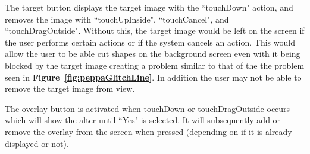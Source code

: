 \documentclass[11pt]{article}
\begin{document}
                    The target button displays the target image with the ``touchDown" action, and removes the image with ``touchUpInside", ``touchCancel", and ``touchDragOutside". Without this, the target image would be left on the screen if the user performs certain actions or if the system cancels an action. This would allow the user to be able cut shapes on the background screen even with it being blocked by the target image creating a problem similar to that of the the problem seen in \textbf{Figure~\ref{fig:peppaGlitchLine}}. In addition the user may not be able to remove the target image from view. 
                    
                    The overlay button is activated when touchDown or touchDragOutside occurs which will show the alter until ``Yes" is selected. It will subsequently add or remove the overlay from the screen when pressed (depending on if it is already displayed or not).
                    
\end{document}
